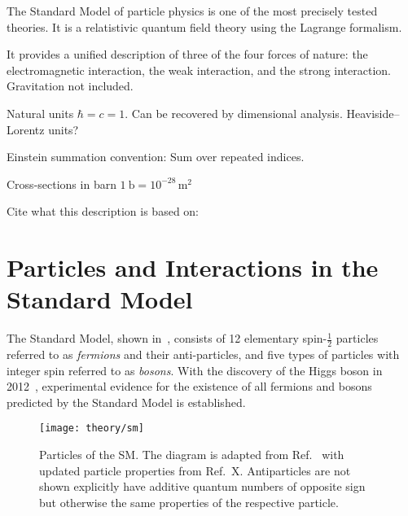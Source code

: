 The Standard Model of particle physics is one of the most precisely tested
theories. It is a relatistivic quantum field theory using the Lagrange
formalism.

It provides a unified description of three of the four forces of nature: the
electromagnetic interaction, the weak interaction, and the strong
interaction. Gravitation not included.

Natural units $\hbar = c = 1$. Can be recovered by dimensional
analysis. Heaviside--Lorentz units?

Einstein summation convention: Sum over repeated indices.

Cross-sections in barn $\SI{1}{\barn} = 10^{-28}\,\si{\metre\squared}$

Cite what this description is based on: \cite{Thomson:2013zua}


\section{Particles and Interactions in the Standard Model}

The Standard Model, shown in~, consists of 12 elementary
spin-$\frac{1}{2}$ particles referred to as \emph{fermions} and their
anti-particles, and five types of particles with integer spin referred to as
\emph{bosons}. With the discovery of the Higgs boson in
2012~\cite{HIGG-2012-27,CMS-HIG-12-028}, experimental evidence for the existence
of all fermions and bosons predicted by the Standard Model is established.

\begin{figure}[htbp]
  \centering

  \texttt{[image: theory/sm]}

  \caption{Particles of the SM. The diagram is adapted from Ref.~
    with updated particle properties from Ref.~X. Antiparticles are not shown
    explicitly have additive quantum numbers of opposite sign but otherwise the
    same properties of the respective particle.}
  \label{fig:sm_particles}
\end{figure}


